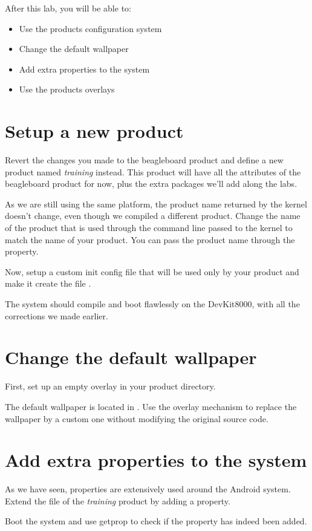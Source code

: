 
After this lab, you will be able to:
\begin{itemize}
  \item Use the products configuration system
  \item Change the default wallpaper
  \item Add extra properties to the system
  \item Use the products overlays
\end{itemize}

\section{Setup a new product}

Revert the changes you made to the beagleboard product and define a new product
named \textit{training} instead. This product will have all the attributes of
the beagleboard product for now, plus the extra packages we'll add along the
labs.

As we are still using the same platform, the product name returned by the
kernel doesn't change, even though we compiled a different product. Change
the name of the product that is used through the command line passed to the
kernel to match the name of your product. You can pass the product name through
the  property.

Now, setup a custom init config file that will be used only by your product and
make it create the file .

The system should compile and boot flawlessly on the DevKit8000, with all the
corrections we made earlier.

\section{Change the default wallpaper}

First, set up an empty overlay in your product directory.

The default wallpaper is located in .
Use the overlay mechanism to replace the wallpaper by a custom one without
modifying the original source code.

\section{Add extra properties to the system}

As we have seen, properties are extensively used around the Android system.
Extend the  file of the \textit{training} product by adding a
 property.

Boot the system and use getprop to check if the property has indeed been added.
